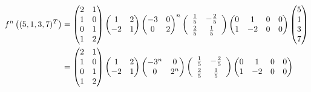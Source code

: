 \documentclass{article}
\begin{document}
        \begin{align*}
            f^n\left((5, 1, 3, 7)^T\right) &= \begin{pmatrix}
    2 & 1 \\ 1 & 0 \\ 0 & 1 \\ 1 & 2
        \end{pmatrix}\begin{pmatrix}
    1 & 2 \\ -2 & 1
        \end{pmatrix}\begin{pmatrix}
   -3 & 0 \\ 0 & 2
 \end{pmatrix}^n\left(\begin{array}{c c}
   \frac{1}{5} & -\frac{2}{5} \vspace{0.25em} \\ \frac{2}{5} & \frac{1}{5}
        \end{array}\right)\begin{pmatrix}
            0 & 1 & 0 & 0 \\ 1 & -2 & 0 & 0
        \end{pmatrix}\begin{pmatrix}
            5 \\ 1 \\ 3 \\ 7
        \end{pmatrix}
            \\ &= \begin{pmatrix}
    2 & 1 \\ 1 & 0 \\ 0 & 1 \\ 1 & 2
        \end{pmatrix}\begin{pmatrix}
    1 & 2 \\ -2 & 1
        \end{pmatrix}\begin{pmatrix}
            -3^n & 0 \\ 0 & 2^n
        \end{pmatrix}\left(\begin{array}{c c}
   \frac{1}{5} & -\frac{2}{5} \vspace{0.25em}\\ \frac{2}{5} & \frac{1}{5}
        \end{array}\right)\begin{pmatrix}
            0 & 1 & 0 & 0 \\ 1 & -2 & 0 & 0

\end{pmatrix}
\end{align*}
\end{document}
